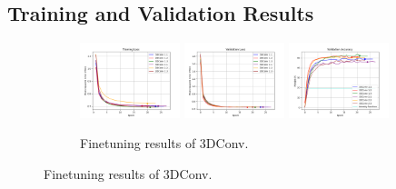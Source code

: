 \documentclass[./main.tex]{subfiles}
\begin{document}
\subsection{Training and Validation Results}
\label{subsec:finetune_train_val_res}
\begin{figure}[htbp]
    \centering
     \begin{subfigure}[b]{\textwidth}
         \centering
         \includegraphics[width=0.32\textwidth]{./entities/finetuned/baseline/train_losses.png}
         \includegraphics[width=0.32\textwidth]{./entities/finetuned/baseline/val_losses.png}
         \includegraphics[width=0.32\textwidth]{./entities/finetuned/baseline/val_accs.png}
         \caption{Finetuning results of 3DConv.}
     \end{subfigure}
    \hfill


\end{figure}
\end{document}
